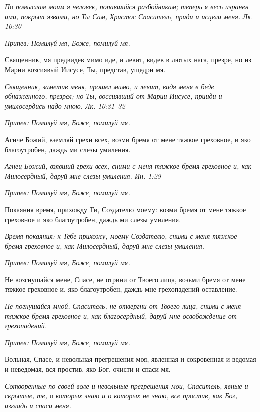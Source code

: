 \itshape По помыслам моим я человек, попавшийся разбойникам; теперь я весь изранен ими, покрыт язвами, но Ты Сам, Христос Спаситель, приди и исцели меня. Лк. 10:30\normalfont{}


\itshape Припев:\normalfont{} Помилуй мя, Боже, помилуй мя.


Священник, мя предвидев мимо иде, и левит, видев в лютых нага, презре, но из Марии возсиявый Иисусе, Ты, представ, ущедри мя.


\itshape Священник, заметив меня, прошел мимо, и левит, видя меня в беде обнаженного, презрел; но Ты, воссиявший от Марии Иисусе, прииди и умилосердись надо мною. Лк. 10:31–32\normalfont{}


\itshape Припев:\normalfont{} Помилуй мя, Боже, помилуй мя.


Агнче Божий, вземляй грехи всех, возми бремя от мене тяжкое греховное, и яко благоутробен, даждь ми слезы умиления.


\itshape Агнец Божий, взявший грехи всех, сними с меня тяжкое бремя греховное и, как Милосердный, даруй мне слезы умиления. Ин. 1:29\normalfont{}


\itshape Припев:\normalfont{} Помилуй мя, Боже, помилуй мя.


Покаяния время, прихожду Ти, Создателю моему: возми бремя от мене тяжкое греховное и яко благоутробен, даждь ми слезы умиления.


\itshape Время покаяния: к Тебе прихожу, моему Создателю, сними с меня тяжкое бремя греховное и, как Милосердный, даруй мне слезы умиления.\normalfont{}


\itshape Припев:\normalfont{} Помилуй мя, Боже, помилуй мя.


Не возгнушайся мене, Спасе, не отрини от Твоего лица, возьми бремя от мене тяжкое греховное и, яко благоутробен, даждь мне грехопадений оставление.


\itshape Не погнушайся мной, Спаситель, не отвергни от Твоего лица, сними с меня тяжкое бремя греховное и, как благосердный, даруй мне освобождение от грехопадений.\normalfont{}


\itshape Припев:\normalfont{} Помилуй мя, Боже, помилуй мя.


Вольная, Спасе, и невольная прегрешения моя, явленная и сокровенная и ведомая и неведомая, вся простив, яко Бог, очисти и спаси мя.


\itshape Сотворенные по своей воле и невольные прегрешения мои, Спаситель, явные и скрытые, те, о которых знаю и о которых не знаю, все простив, как Бог, изгладь и спаси меня.\normalfont{}


